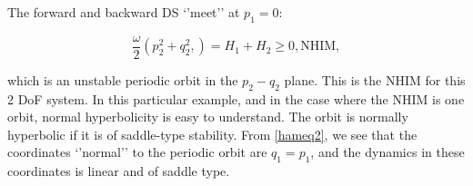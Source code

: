 \documentclass{article}
\begin{document}
The forward and backward DS `'meet'' at  $p_1 =0$:

\begin{equation}
 \frac{\omega}{2} \left(p_2^2 + q_2^2, \right) = H_1 + H_2 \ge  0,   \mbox{NHIM},
\end{equation}

\noindent
which is an unstable periodic orbit in the $p_2-q_2$ plane. This is   the NHIM for this 2 DoF system. In this particular example, and in the case where the NHIM is one orbit, normal hyperbolicity is easy to understand. The orbit is normally hyperbolic if it is of saddle-type stability. From \eqref{hameq2}, we see that the coordinates `'normal'' to the periodic orbit are $q_1=p_1$, and the dynamics in these coordinates is linear and of saddle type.
\end{document}
